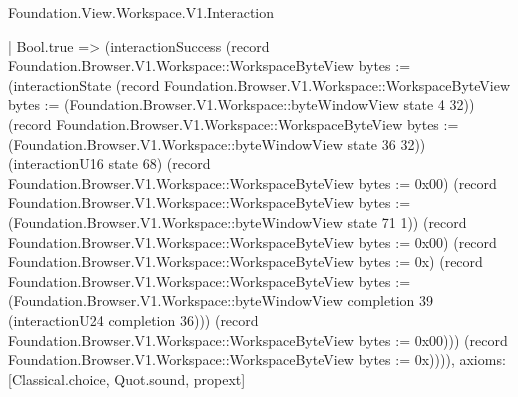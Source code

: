 \begin{lexlean}{Foundation.View.Workspace.V1.Interaction}
\begin{semanticmodule}
{      | Bool.true => (interactionSuccess (record Foundation.Browser.V1.Workspace::WorkspaceByteView {bytes := (interactionState (record Foundation.Browser.V1.Workspace::WorkspaceByteView {bytes := (Foundation.Browser.V1.Workspace::byteWindowView state 4 32)}) (record Foundation.Browser.V1.Workspace::WorkspaceByteView {bytes := (Foundation.Browser.V1.Workspace::byteWindowView state 36 32)}) (interactionU16 state 68) (record Foundation.Browser.V1.Workspace::WorkspaceByteView {bytes := 0x00}) (record Foundation.Browser.V1.Workspace::WorkspaceByteView {bytes := (Foundation.Browser.V1.Workspace::byteWindowView state 71 1)}) (record Foundation.Browser.V1.Workspace::WorkspaceByteView {bytes := 0x00}) (record Foundation.Browser.V1.Workspace::WorkspaceByteView {bytes := 0x}) (record Foundation.Browser.V1.Workspace::WorkspaceByteView {bytes := (Foundation.Browser.V1.Workspace::byteWindowView completion 39 (interactionU24 completion 36))}) (record Foundation.Browser.V1.Workspace::WorkspaceByteView {bytes := 0x00}))}) (record Foundation.Browser.V1.Workspace::WorkspaceByteView {bytes := 0x})))),
  axioms: [Classical.choice, Quot.sound, propext]
}


\end{semanticmodule}
\end{lexlean}
